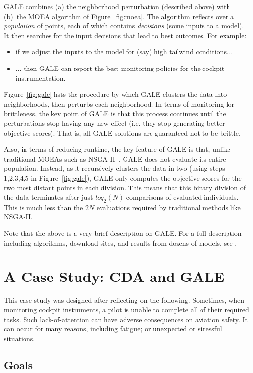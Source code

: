 \documentclass[journal]{IEEEtran}
\newcommand{\fig}[1]{Figure~\ref{fig:#1}}
\begin{document}
GALE combines (a) the neighborhood perturbation (described above) with (b)~the MOEA algorithm of \fig{moea}.
The algorithm reflects over a {\em population} of points, each of which contains {\em decisions} (some inputs to a  model).
It then searches for the input decisions that lead to best outcomes.
For example:
\begin{itemize}
\item
if we adjust the inputs to the model for (say) high tailwind conditions...
\item
... then GALE can report the best monitoring policies for the cockpit instrumentation.
\end{itemize}

\fig{gale} lists the procedure by which GALE clusters the data into neighborhoods, then perturbs each neighborhood.
In terms of monitoring for brittleness, the key point of GALE is that  this process continues until the perturbations stop having any new effect (i.e. they stop generating better objective scores). 
That is, all GALE solutions are guaranteed not to be brittle.


Also, in terms of reducing runtime, the key feature of GALE is that, unlike traditional MOEAs such as NSGA-II~\cite{deb00afast}, GALE does not evaluate its entire population.
Instead, as it recursively clusters the data in two (using steps 1,2,3,4,5 in \fig{gale}), GALE only computes the objective scores for the two most distant points in each division.  
This means that this binary division of the data terminates after just $log_2(N)$ comparisons of evaluated individuals. 
This is much less than the $2N$ evaluations required by  traditional methods like NSGA-II.

Note that the above is a very brief description on GALE. For a full description including algorithms, download sites, and results
from dozens of models, see \cite{galepaper,krallphd}.

\section{A Case Study:  CDA and GALE}\label{sec:case}

This case study was designed after reflecting on the following.
Sometimes, when monitoring cockpit instruments, a pilot is unable to complete all of their required tasks.
Such lack-of-attention can have adverse consequences on aviation safety.
It can occur for many reasons, including  fatigue; or
 unexpected or stressful situations.
\subsection{Goals}
\end{document}
